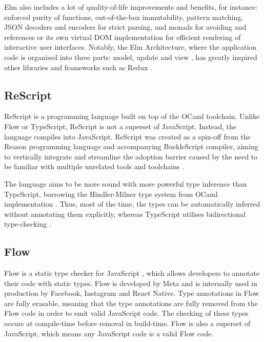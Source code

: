 Elm also includes a lot of quality-of-life improvements and benefits, for instance: enforced purity of functions, out-of-the-box immutability,  pattern matching, JSON decoders and encoders for strict parsing,  and  monads for avoiding  and  references or its own virtual DOM implementation for efficient rendering of interactive user interfaces. Notably, the Elm Architecture, where the application code is organised into three parts: model, update and view \cite{ElmArchitectureIntroduction}, has greatly inspired other libraries and frameworks such as Redux \cite{PriorArtRedux2022}.

\subsection{ReScript}

ReScript is a programming language built on top of the OCaml toolchain. Unlike Flow or TypeScript, ReScript is not a superset of JavaScript. Instead, the language compiles into JavaScript. ReScript was created as a spin-off from the Reason programming language and accompanying BuckleScript compiler, aiming to vertically integrate and streamline the adoption barrier caused by the need to be familiar with multiple unrelated tools and toolchains \cite{BuckleScriptReasonRebranding}.

The language aims to be more sound with more powerful type inference than TypeScript, borrowing the Hindler-Milner type system from OCaml implementation \cite{EfficientInsightfulGeneralization, HistoryReScript2022}. Thus, most of the time, the types can be automatically inferred without annotating them explicitly, whereas TypeScript utilises bidirectional type-checking \cite{ReconstructingTypeScriptPart}.

\subsection{Flow}

Flow is a static type checker for JavaScript \cite{chaudhuriFastPreciseType2017, Flow2023}, which allows developers to annotate their code with static types. Flow is developed by Meta and is internally used in production by Facebook, Instagram and React Native. Type annotations in Flow are fully erasable, meaning that the type annotations are fully removed from the Flow code in order to emit valid JavaScript code. The checking of these types occurs at compile-time before removal in build-time. Flow is also a superset of JavaScript, which means any JavaScript code is a valid Flow code.

